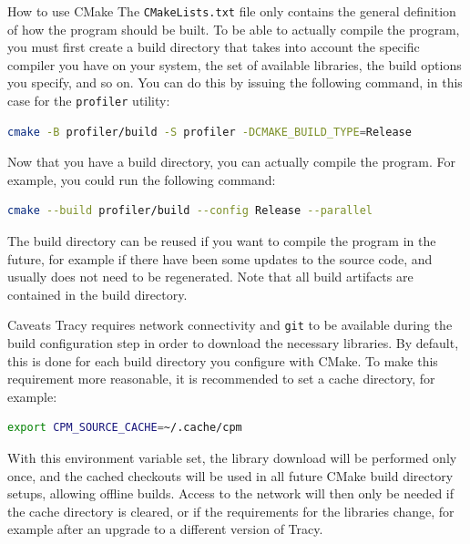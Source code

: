 \documentclass[hidelinks,titlepage,a4paper,twoside]{article}
\begin{document}
\begin{bclogo}[
noborder=true,
couleur=black!5,
logo=\bclampe
]{How to use CMake}
The \texttt{CMakeLists.txt} file only contains the general definition of how the program should be built. To be able to actually compile the program, you must first create a build directory that takes into account the specific compiler you have on your system, the set of available libraries, the build options you specify, and so on. You can do this by issuing the following command, in this case for the \texttt{profiler} utility:

\begin{lstlisting}[language=sh]
cmake -B profiler/build -S profiler -DCMAKE_BUILD_TYPE=Release
\end{lstlisting}

Now that you have a build directory, you can actually compile the program. For example, you could run the following command:

\begin{lstlisting}[language=sh]
cmake --build profiler/build --config Release --parallel
\end{lstlisting}

The build directory can be reused if you want to compile the program in the future, for example if there have been some updates to the source code, and usually does not need to be regenerated. Note that all build artifacts are contained in the build directory.
\end{bclogo}

\begin{bclogo}[
noborder=true,
couleur=black!5,
logo=\bcattention
]{Caveats}
Tracy requires network connectivity and \texttt{git} to be available during the build configuration step in order to download the necessary libraries. By default, this is done for each build directory you configure with CMake. To make this requirement more reasonable, it is recommended to set a cache directory, for example:

\begin{lstlisting}[language=sh]
export CPM_SOURCE_CACHE=~/.cache/cpm
\end{lstlisting}

With this environment variable set, the library download will be performed only once, and the cached checkouts will be used in all future CMake build directory setups, allowing offline builds. Access to the network will then only be needed if the cache directory is cleared, or if the requirements for the libraries change, for example after an upgrade to a different version of Tracy.
\end{bclogo}
\end{document}
